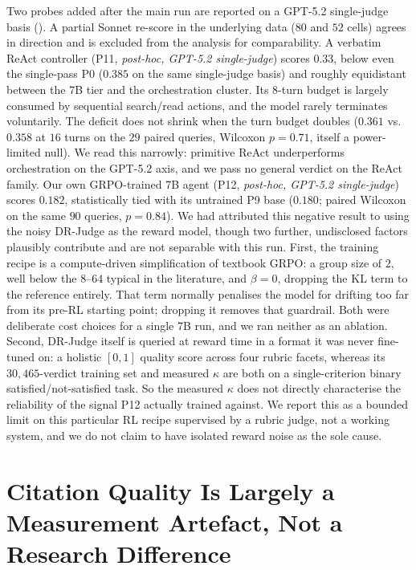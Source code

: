 \documentclass[11pt]{article}
\begin{document}
Two probes added after the main run are reported on a GPT-5.2 single-judge basis
(). A partial Sonnet re-score in the
underlying data ($80$ and $52$ cells) agrees in direction and is excluded from the
analysis for comparability. A verbatim ReAct controller (P11, \emph{post-hoc, GPT-5.2
single-judge}) scores $0.33$, below even the single-pass P0 ($0.385$ on the same
single-judge basis) and roughly equidistant between the 7B tier and the orchestration
cluster. Its 8-turn budget is largely consumed by sequential search/read
actions, and the model rarely terminates voluntarily. The deficit does not shrink when
the turn budget doubles ($0.361$ vs.\ $0.358$ at $16$ turns on the $29$ paired queries,
Wilcoxon $p{=}0.71$, itself a power-limited null). We read this narrowly: primitive
ReAct underperforms orchestration on the GPT-5.2 axis, and we pass no
general verdict on the ReAct family. Our own GRPO-trained 7B agent (P12, \emph{post-hoc, GPT-5.2 single-judge}) scores $0.182$,
statistically tied with its untrained P9 base ($0.180$; paired Wilcoxon on the same $90$
queries, $p{=}0.84$). We had attributed this negative result to using the noisy DR-Judge
as the reward model, though two further, undisclosed factors plausibly contribute and
are not separable with this run. First, the training recipe is a compute-driven
simplification of textbook GRPO: a group size of $2$, well below the $8$--$64$ typical
in the literature, and $\beta=0$, dropping the KL term to the reference entirely. That term
normally penalises the model for drifting too far from its pre-RL starting point;
dropping it removes that guardrail. Both were deliberate cost choices for a single 7B
run, and we ran neither as an ablation. Second, DR-Judge
itself is queried at reward time in a format it was never fine-tuned on: a holistic
$[0,1]$ quality score across four rubric facets, whereas its $30{,}465$-verdict training
set and measured $\kappa$ are both on a single-criterion binary satisfied/not-satisfied
task. So the measured $\kappa$ does not directly characterise the reliability of the
signal P12 actually trained against. We report this as a bounded limit on this
particular RL recipe supervised by a rubric judge, not a working system, and we do not claim
to have isolated reward noise as the sole cause.

\section{Citation Quality Is Largely a Measurement Artefact, Not a Research Difference}\label{sec:retrieval}
\end{document}
